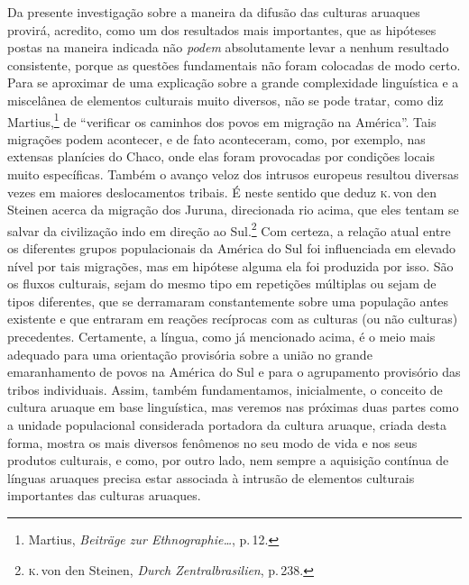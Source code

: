 Da presente investigação sobre a maneira da difusão das culturas
aruaques provirá, acredito, como um dos resultados mais importantes, que
as hipóteses postas na maneira indicada não \textit{podem} absolutamente
levar a nenhum resultado consistente, porque as questões fundamentais
não foram colocadas de modo certo. Para se aproximar de uma explicação
sobre a grande complexidade linguística e a miscelânea de elementos
culturais muito diversos, não se pode tratar, como diz Martius,\footnote{Martius,
  \textit{Beiträge zur Ethnographie\ldots}, p.\,12.} de ``verificar os caminhos dos povos em migração na América''.
Tais migrações podem acontecer, e de fato aconteceram, como, por
exemplo, nas extensas planícies do Chaco, onde elas foram provocadas por
condições locais muito específicas. Também o avanço veloz dos intrusos
europeus resultou diversas vezes em maiores deslocamentos tribais.
É neste sentido que deduz \textsc{k}.\,von den Steinen acerca da migração dos Juruna, direcionada rio
acima, que eles tentam se salvar da civilização indo em direção ao
Sul.\footnote{\textsc{k}.\,von den Steinen, \textit{Durch Zentralbrasilien}, p.\,238.}
Com certeza, a relação atual entre os diferentes grupos populacionais da
América do Sul foi influenciada em elevado nível por tais migrações, mas
em hipótese alguma ela foi produzida por isso. São os fluxos culturais,
sejam do mesmo tipo em repetições múltiplas ou sejam de tipos
diferentes, que se derramaram constantemente sobre uma população antes
existente e que entraram em reações recíprocas com as culturas (ou
não culturas) precedentes. Certamente, a língua, como já mencionado
acima, é o meio mais adequado para uma orientação provisória sobre a
união no grande emaranhamento de povos na América do Sul e para o
agrupamento provisório das tribos individuais. Assim, também
fundamentamos, inicialmente, o conceito de cultura aruaque em base
linguística, mas veremos nas próximas duas partes como a unidade
populacional considerada portadora da cultura aruaque, criada desta
forma, mostra os mais diversos fenômenos no seu modo de vida e nos seus
produtos culturais, e como, por outro lado, nem sempre a aquisição
contínua de línguas aruaques precisa estar associada à intrusão de
elementos culturais importantes das culturas aruaques.

